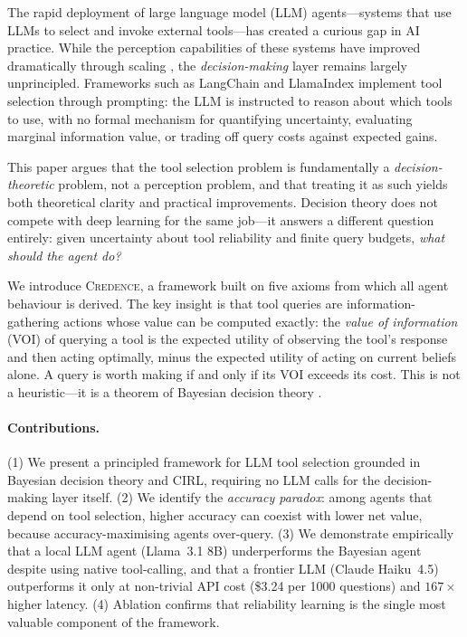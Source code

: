 \documentclass[11pt]{article}
\newcommand{\credence}{\textsc{Credence}}
\begin{document}
The rapid deployment of large language model (LLM) agents---systems that use LLMs to select and invoke external tools---has created a curious gap in AI practice. While the perception capabilities of these systems have improved dramatically through scaling \citep{sutton2019bitter}, the \emph{decision-making} layer remains largely unprincipled. Frameworks such as LangChain \citep{chase2022langchain} and LlamaIndex implement tool selection through prompting: the LLM is instructed to reason about which tools to use, with no formal mechanism for quantifying uncertainty, evaluating marginal information value, or trading off query costs against expected gains.

This paper argues that the tool selection problem is fundamentally a \emph{decision-theoretic} problem, not a perception problem, and that treating it as such yields both theoretical clarity and practical improvements. Decision theory does not compete with deep learning for the same job---it answers a different question entirely: given uncertainty about tool reliability and finite query budgets, \emph{what should the agent do?}

We introduce \credence{}, a framework built on five axioms from which all agent behaviour is derived. The key insight is that tool queries are information-gathering actions whose value can be computed exactly: the \emph{value of information} (VOI) of querying a tool is the expected utility of observing the tool's response and then acting optimally, minus the expected utility of acting on current beliefs alone. A query is worth making if and only if its VOI exceeds its cost. This is not a heuristic---it is a theorem of Bayesian decision theory \citep{raiffa1961applied, degroot1984optimal}.

\paragraph{Contributions.} (1) We present a principled framework for LLM tool selection grounded in Bayesian decision theory and CIRL, requiring no LLM calls for the decision-making layer itself. (2) We identify the \emph{accuracy paradox}: among agents that depend on tool selection, higher accuracy can coexist with lower net value, because accuracy-maximising agents over-query. (3) We demonstrate empirically that a local LLM agent (Llama~3.1 8B) underperforms the Bayesian agent despite using native tool-calling, and that a frontier LLM (Claude Haiku~4.5) outperforms it only at non-trivial API cost (\$3.24 per 1000 questions) and $167\times$ higher latency. (4) Ablation confirms that reliability learning is the single most valuable component of the framework.
\end{document}
